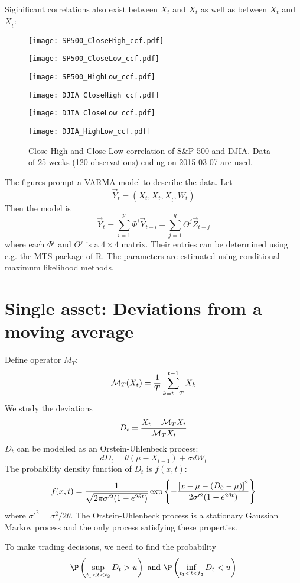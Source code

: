 \documentclass{article}
\begin{document}
Siginificant correlations also exist between $X_t$ and $\overline X_t$
as well as between $X_t$ and $\underline X_t$:
\begin{figure}[!htb]
\begin{minipage}{0.33\linewidth}
  \texttt{[image: SP500\_CloseHigh\_ccf.pdf]}
\end{minipage}\hfill
\begin{minipage}{0.33\linewidth}
  \texttt{[image: SP500\_CloseLow\_ccf.pdf]}
\end{minipage}\hfill
\begin{minipage}{0.33\linewidth}
  \texttt{[image: SP500\_HighLow\_ccf.pdf]}
\end{minipage}
\begin{minipage}{0.33\linewidth}
  \texttt{[image: DJIA\_CloseHigh\_ccf.pdf]}
\end{minipage}\hfill
\begin{minipage}{0.33\linewidth}
  \texttt{[image: DJIA\_CloseLow\_ccf.pdf]}
\end{minipage}\hfill
\begin{minipage}{0.33\linewidth}
  \texttt{[image: DJIA\_HighLow\_ccf.pdf]}
\end{minipage}
\caption{Close-High and Close-Low correlation of S\&P 500 and
  DJIA. Data of 25 weeks (120 observations) ending on 2015-03-07 are
  used.}
\end{figure}

The figures prompt a VARMA model to describe the data. Let
\[
\vec Y_t = (\overline X_t, X_t, \underline X_t, W_t)
\]
Then the model is
\[
\vec Y_t = \sum_{i=1}^p \Phi^i \vec Y_{t-i} + \sum_{j=1}^q \Theta^j \vec Z_{t-j}
\]
where each $\Phi^i$ and $\Theta^j$ is a $4 \times 4$ matrix. Their
entries can be determined using e.g. the MTS package of R. The
parameters are estimated using conditional maximum likelihood methods.

\section{Single asset: Deviations from a moving average}
Define operator $M_T$:
\[
\mathcal M_T(X_t) = {1 \over T}\sum_{k = t - T}^{t - 1} X_k
\]
We study the deviations
\[
D_t = {X_t - \mathcal M_T X_t \over \mathcal M_T X_t}
\]
$D_t$ can be modelled as an Orstein-Uhlenbeck process:
\[
d D_t = \theta (\mu - X_{t-1}) + \sigma d W_t
\]
The probability density function of $D_t$ is $f(x, t)$:
\[
f(x, t) = {1
  \over
  \sqrt{2 \pi \sigma'^2 (1 - e^{2 \theta t})}
}
\exp \left\{
- {
  \left[ x - \mu - (D_0 - \mu) \right]^2
  \over
  2 \sigma'^2 (1 - e^{2 \theta t})
}
\right\}
\]
where $\sigma'^2 = \sigma^2/2\theta$. The Orstein-Uhlenbeck process is
a stationary Gaussian Markov process and the only process satisfying
these properties.

To make trading decisions, we need to find the probability
\[
\P \left( \sup_{t_1 < t < t_2} D_t > u\right) \text{ and }
\P \left( \inf_{t_1 < t < t_2} D_t < u\right)
\]
\end{document}
